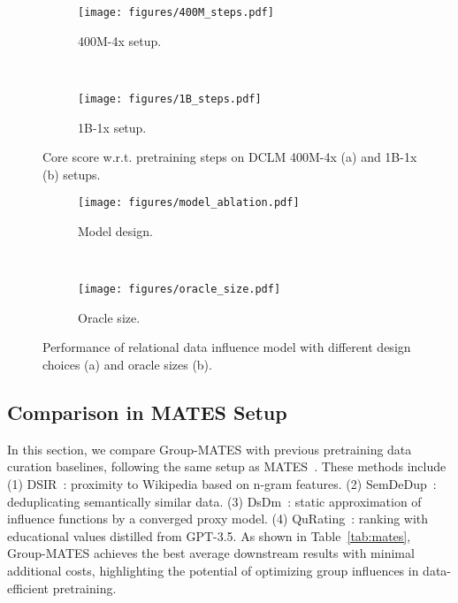 \begin{figure}[h]
    \centering
    \begin{minipage}{0.49\textwidth}
    \centering
    \begin{subfigure}[t]{0.47\textwidth}
    \centering
    \texttt{[image: figures/400M\_steps.pdf]}
    \caption{400M-4x setup.}
    \label{fig:400M-flops}
    \end{subfigure}
    ~
    \begin{subfigure}[t]{0.47\textwidth}
    \centering
    \texttt{[image: figures/1B\_steps.pdf]}
    \caption{1B-1x setup.}
    \label{fig:1B-flops}
    \end{subfigure}
    \caption{Core score w.r.t. pretraining steps on DCLM 400M-4x (a) and 1B-1x (b) setups.}
    \label{fig:flops}
    \end{minipage}
    \hfill
    \begin{minipage}{0.49\textwidth}
    \centering
    \begin{subfigure}[t]{0.47\textwidth}
    \centering
    \texttt{[image: figures/model\_ablation.pdf]}
    \caption{Model design.}
    \label{fig:model-design}
    \end{subfigure}
    ~
    \begin{subfigure}[t]{0.47\textwidth}
    \centering
    \texttt{[image: figures/oracle\_size.pdf]}
    \caption{Oracle size.}
    \label{fig:oracle-size}
    \end{subfigure}
    \caption{Performance of relational data influence model with different design choices (a) and oracle sizes (b).}
    \end{minipage}
\end{figure}

\subsection{Comparison in MATES Setup}
\label{sec:mates}

In this section, we compare Group-MATES with previous pretraining data curation baselines, following the same setup as MATES~\cite{yu2024mates}. These methods include (1) DSIR~\cite{xie2023data}: proximity to Wikipedia based on n-gram features. (2) SemDeDup~\cite{abbas2023semdedup}: deduplicating semantically similar data. (3) DsDm~\cite{engstrom2024dsdm}: static approximation of influence functions by a converged proxy model. (4) QuRating~\cite{wettig2024qurating}: ranking with educational values distilled from GPT-3.5. As shown in Table~\ref{tab:mates}, Group-MATES achieves the best average downstream results with minimal additional costs, highlighting the potential of optimizing group influences in data-efficient pretraining.






